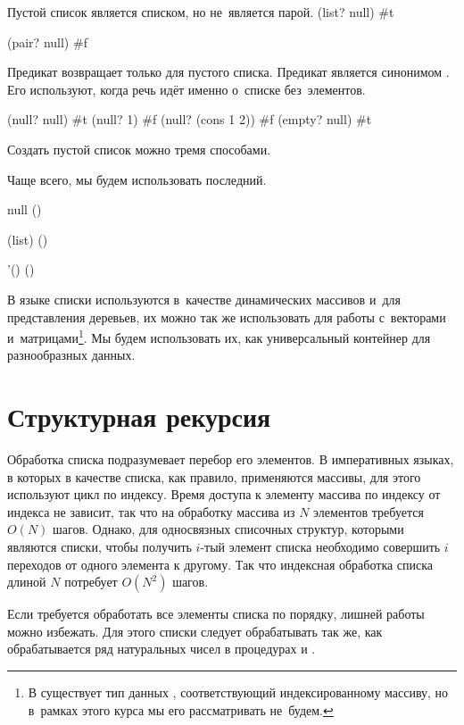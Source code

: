 \begin{example}{%
Пустой список является списком, но не~является парой.} 
\REPL
  {(list? null)}
  {#t} 

\REPL
  {(pair? null)}
  {#f}
\end{example}

\begin{example}{%
Предикат  возвращает   только для пустого списка.
Предикат  является синонимом . Его используют, когда речь идёт именно о~списке без~элементов.}

\REPL
  {(null? null)}
  {#t}
\REPL
  {(null? 1)}
  {#f}
\REPL
  {(null? (cons 1 2))}
  {#f}
\REPL
  {(empty? null)}
  {#t}
\end{example}

\vspace{-\medskipamount}
\begin{example}{Создать пустой список можно тремя способами.

Чаще всего, мы будем использовать последний.}
\REPL
  {null}
  {()}

\REPL
  {(list)}
  {()}

\REPL
  {'()}
  {()}
\end{example}

В языке \Scheme списки используются в~качестве динамических массивов и~для представления деревьев, их можно так же использовать для работы с~векторами и~матрицами\footnote{В \Scheme существует тип данных , соответствующий индексированному массиву, но в~рамках этого курса мы его рассматривать не~будем.}. Мы будем использовать их, как универсальный контейнер для разнообразных данных.

\section{Структурная рекурсия}%
\label{struct-recursion}%
Обработка списка подразумевает перебор его элементов. В императивных языках, в которых в качестве списка, как правило, применяются массивы, для этого используют цикл по индексу. Время доступа к элементу массива по индексу от индекса не зависит, так что на обработку массива из $N$ элементов требуется $O(N)$ шагов. 
Однако, для односвязных списочных структур, которыми являются списки, чтобы получить $i$-тый элемент списка необходимо совершить $i$ переходов от одного элемента к другому. Так что индексная обработка списка длиной $N$ потребует $O(N^2)$ шагов.

Если требуется обработать все элементы списка по порядку, лишней работы можно избежать. Для этого списки следует обрабатывать так же, как обрабатывается ряд натуральных чисел в процедурах  и . 


